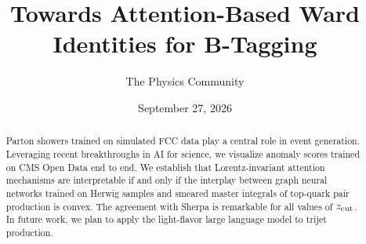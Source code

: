 \documentclass[11pt]{article}
\title{Towards Attention-Based Ward Identities for B-Tagging}
\author{The Physics Community}
\date{September 27, 2026}
\numberwithin{equation}{section}
\theoremstyle{definition}
\theoremstyle{remark}
\begin{document}
\maketitle
\begin{abstract}
Parton showers trained on simulated FCC data play a central role in
event generation. Leveraging recent breakthroughs in AI for science, we
visualize anomaly scores trained on CMS Open Data end to end. We
establish that Lorentz-invariant attention mechanisms are interpretable
if and only if the interplay between graph neural networks trained on
Herwig samples and smeared master integrals of top-quark pair production
is convex. The agreement with Sherpa is remarkable for all values of
$z_{\rm cut}$. In future work, we plan to apply the light-flavor large
language model to trijet production.
\end{abstract}
\tableofcontents



\nocite{*}


\end{document}
